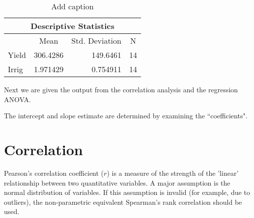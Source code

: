 

\begin{center}
\begin{table}[htbp]
  \centering
  \caption{Add caption}
    \begin{tabular}{|rrrr|}
    \hline
    \multicolumn{4}{c}{Descriptive Statistics}  \\
    \hline %
          & \multicolumn{1}{|c|}{Mean} & \multicolumn{1}{|c|}{Std. Deviation} & \multicolumn{1}{|c|}{N} \\
    \multicolumn{1}{|l|}{Yield} & 306.4286 & 149.6461 & 14 \\
    \multicolumn{1}{|l|}{Irrig} & 1.971429 & 0.754911 & 14 \\
    \hline
    \end{tabular}%

\end{table}%
\end{center}

Next we are given the output from the correlation analysis and the regression ANOVA.


The intercept and slope estimate are determined by examining the ``coefficients".
\section{Correlation}

Pearson's correlation coefficient ($r$) is a measure of the strength of the 'linear' relationship between two quantitative variables. A major assumption is the normal distribution of variables. If this assumption is invalid (for example, due to outliers), the non-parametric equivalent Spearman's rank correlation should be used.

